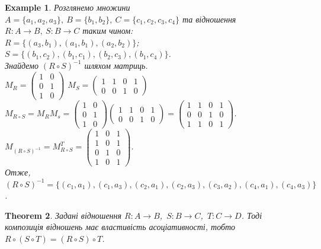 \documentclass[a4paper, 14pt]{extarticle}
\theoremstyle{theoremdd}
\newtheorem{theorem}{Theorem}[subsection]
\theoremstyle{theoremdd}
\theoremstyle{theoremdd}
\theoremstyle{theoremdd}
\theoremstyle{theoremdd}
\newtheorem{example}[theorem]{Example}
\theoremstyle{theoremdd}
\theoremstyle{theoremdd}
\theoremstyle{theoremdd}
\theoremstyle{theoremdd}
\theoremstyle{theoremdd}
\theoremstyle{theoremdd}
\theoremstyle{theoremdd}
\theoremstyle{theoremdd}
\theoremstyle{theoremdd}
\theoremstyle{theoremdd}
\begin{document}
\begin{example}
Розглянемо множини $A = \{a_1,a_2,a_3\},\ B = \{b_1,b_2\},\ C = \{c_1,c_2,c_3,c_4\}$ та відношення $R \colon A \to B,\ S \colon B \to C$ таким чином:\\
$R = \{(a_3,b_1), (a_1,b_1), (a_2,b_2)\}$; \\
$S = \{(b_1,c_2),(b_1,c_1),(b_2,c_3),(b_1,c_4)\}$.\\
Знайдемо $(R \circ S)^{-1}$ шляхом матриць.\\
$M_R = \begin{pmatrix}
1 & 0 \\
0 & 1 \\
1 & 0
\end{pmatrix}$ \qquad $M_S = \begin{pmatrix}
1 & 1 & 0 & 1 \\
0 & 0 & 1 & 0
\end{pmatrix}$\\
$M_{R \circ S} = M_R M_s =  \begin{pmatrix}
1 & 0 \\
0 & 1 \\
1 & 0
\end{pmatrix} \begin{pmatrix}
1 & 1 & 0 & 1 \\
0 & 0 & 1 & 0
\end{pmatrix} = \begin{pmatrix}
1 & 1 & 0 & 1 \\
0 & 0 & 1 & 0 \\
1 & 1 & 0 & 1
\end{pmatrix}$.\\
$M_{(R \circ S)^{-1}} = M_{R \circ S}^T = \begin{pmatrix}
1 & 0 & 1 \\
1 & 0 & 1 \\
0 & 1 & 0 \\
1 & 0 & 1
\end{pmatrix}$.\\
Отже, $(R \circ S)^{-1} = \{ (c_1,a_1), (c_1,a_3), (c_2,a_1), (c_2,a_3), (c_3,a_2), (c_4,a_1), (c_4,a_3) \}$.
\end{example}

\begin{theorem}
Задані відношення $R \colon A \to B$,\ $S \colon B \to C$,\ $T \colon C \to D$. Тоді композиція відношень має властивість асоціативності, тобто\\
$R \circ (S \circ T) = (R \circ S) \circ T$.
\end{theorem}
\end{document}
